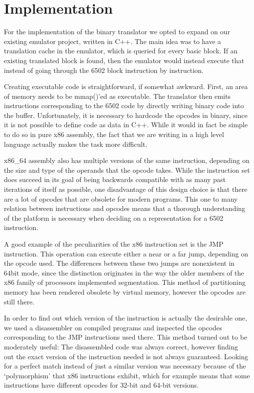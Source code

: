 \section{Implementation}

For the implementation of the binary translator we opted to expand on our existing emulator project, written in C++.
The main idea was to have a translation cache in the emulator, which is queried for every basic block. 
If an existing translated block is found, then the emulator would instead execute that instead of going through the 6502 block instruction by instruction.

Creating executable code is straightforward, if somewhat awkward. First, an area of memory needs to be mmap()'ed as executable. 
The translator then emits instructions corresponding to the 6502 code by directly writing binary code into the buffer. 
Unfortunately, it is necessary to hardcode the opcodes in binary, since it is not possible to define code as data in C++. 
While it would in fact be simple to do so in pure x86 assembly, the fact that we are writing in a high level language actually makes the task more difficult.

x86\_64 assembly also has multiple versions of the same instruction, depending on the size and type of the operands that the opcode takes.
While the instruction set does succeed in its goal of being backwards compatible with as many past iterations of itself as possible, one disadvantage of this design choice is that there are a lot of opcodes that are obsolete for modern programs.
This one to many relation between instructions and opcodes means that a thorough understanding of the platform is necessary when deciding on a representation for a 6502 instruction.

A good example of the peculiarities of the x86 instruction set is the JMP instruction. 
This operation can execute either a near or a far jump, depending on the opcode used.
The differences between these two jumps are nonexistent in 64bit mode, since the distinction originates in the way the older members of the x86 family of processors implemented segmentation.
This method of partitioning memory has been rendered obsolete by virtual memory, however the opcodes are still there.

In order to find out which version of the instruction is actually the desirable one, we used a disassembler on compiled programs and inspected the opcodes corresponding to the JMP instructions used there.
This method turned out to be moderately useful: The disassembled code was always correct, however finding out the exact version of the instruction needed is not always guaranteed.
Looking for a perfect match instead of just a similar version was necessary because of the `polymorphism' that x86 instructions exhibit, which for example means that some instructions have different opcodes for 32-bit and 64-bit versions.

